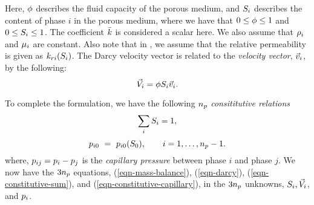 Here, $\phi$ describes the fluid capacity of the porous medium,
and $S_i$ describes the content of phase $i$ in the porous medium,
where we have that $0 \le \phi \le 1$ and $0 \le S_i \le 1$.
The coefficient ${\bar k}$ is considered a scalar here.
We also assume that $\rho_i$ and $\mu_i$ are constant.
Also note that in \parflow{}, we assume that the relative permeability
is given as $k_{ri} (S_i)$.
The Darcy velocity vector is related to the {\em velocity vector}, ${\vec v}_i$,
by the following:
\begin{equation} \label{eqn-Dvec-vs-vvec}
{\vec V}_i = \phi S_i {\vec v}_i .
\end{equation}

To complete the formulation, we have the following
$n_p$ {\em consititutive relations}
\begin{equation} \label{eqn-constitutive-sum}
\sum_i S_i = 1 ,
\end{equation}
\begin{equation} \label{eqn-constitutive-capillary}
p_{i0} ~=~ p_{i0} ( S_0 ) ,
~~~~~~ i = 1 , \ldots , n_p - 1 .
\end{equation}
where, $p_{ij} = p_i - p_j$ is the {\em capillary pressure} between
phase $i$ and phase $j$.
We now have the $3 n_p$ equations,
(\ref{eqn-mass-balance}), (\ref{eqn-darcy}),
(\ref{eqn-constitutive-sum}), and (\ref{eqn-constitutive-capillary}),
in the $3 n_p$ unknowns,
$S_i, {\vec V}_i$, and $p_i$.

